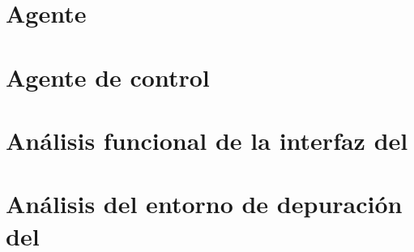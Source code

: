 \section{Agente }
\label{sec:ana_switch}

\section{Agente de control }
\label{sec:ana_controller}

\section{Análisis funcional de la interfaz del }
\label{sec:ana_bofuss}



\section{Análisis del entorno de depuración del }
\label{sec:ana_gdb}



